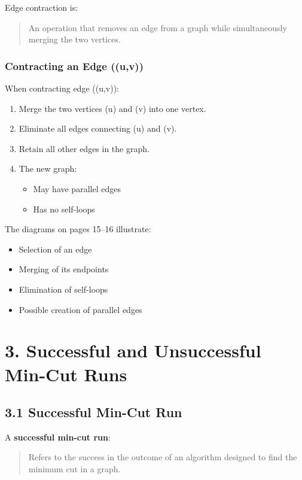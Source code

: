 \documentclass[12pt]{article}
\begin{document}
Edge contraction is:

\begin{quote}
An operation that removes an edge from a graph while simultaneously merging the two vertices.
\end{quote}

\bigskip

\subsubsection*{Contracting an Edge ((u,v))}

When contracting edge ((u,v)):

\begin{enumerate}
\item Merge the two vertices (u) and (v) into one vertex.
\item Eliminate all edges connecting (u) and (v).
\item Retain all other edges in the graph.
\item The new graph:
\begin{itemize}
\item May have parallel edges
\item Has no self-loops
\end{itemize}
\end{enumerate}

The diagrams on pages 15–16 illustrate:

\begin{itemize}
\item Selection of an edge
\item Merging of its endpoints
\item Elimination of self-loops
\item Possible creation of parallel edges
\end{itemize}

\bigskip

\section*{3. Successful and Unsuccessful Min-Cut Runs}

\subsection*{3.1 Successful Min-Cut Run}

A \textbf{successful min-cut run}:

\begin{quote}
Refers to the success in the outcome of an algorithm designed to find the minimum cut in a graph.
\end{quote}
\end{document}
